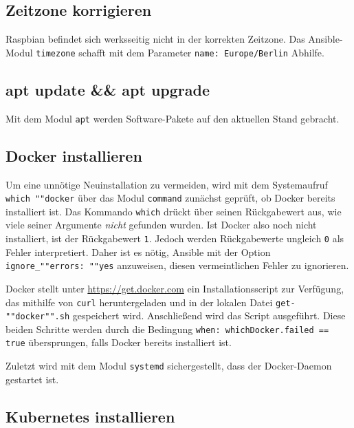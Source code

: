 \subsection{Zeitzone korrigieren}\label{subsec:zeitzone-korrigieren}

Raspbian befindet sich werksseitig nicht in der korrekten Zeitzone.
Das Ansible-Modul \texttt{timezone} schafft mit dem Parameter \texttt{name: Europe/Berlin} Abhilfe.

\subsection{apt update \&\& apt upgrade}

Mit dem Modul \texttt{apt} werden Software-Pakete auf den aktuellen Stand gebracht.

\subsection{Docker installieren}\label{subsec:docker-installieren}

Um eine unnötige Neuinstallation zu vermeiden, wird mit dem Systemaufruf \texttt{which ""docker} über das Modul \texttt{command} zunächst geprüft, ob Docker bereits installiert ist.
Das Kommando \texttt{which} drückt über seinen Rückgabewert aus, wie viele seiner Argumente \emph{nicht} gefunden wurden.
Ist Docker also noch nicht installiert, ist der Rückgabewert \texttt{1}.
Jedoch werden Rückgabewerte ungleich \texttt{0} als Fehler interpretiert.
Daher ist es nötig, Ansible mit der Option \texttt{ignore\_""errors: ""yes} anzuweisen, diesen vermeintlichen Fehler zu ignorieren.

Docker stellt unter \url{https://get.docker.com} ein Installationsscript zur Verfügung, das mithilfe von \texttt{curl} heruntergeladen und in der lokalen Datei \texttt{get-""docker"".sh} gespeichert wird.
Anschließend wird das Script ausgeführt.
Diese beiden Schritte werden durch die Bedingung \texttt{when: whichDocker.failed == true} übersprungen, falls Docker bereits installiert ist.

Zuletzt wird mit dem Modul \texttt{systemd} sichergestellt, dass der Docker-Daemon gestartet ist.

\subsection{Kubernetes installieren}\label{subsec:kubernetes-installieren}

